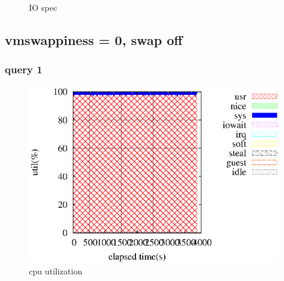 \documentclass[11pt,a4paper]{jsarticle}
\newlength{\subfigwidth}
\newlength{\subfigcolsep}
\begin{document}
\begin{figure}[thbp]
 \setlength{\subfigwidth}{.5\linewidth}
 \addtolength{\subfigwidth}{-.5\subfigcolsep}
 \begin{minipage}[b]{\subfigwidth}
 \end{minipage}
  \begin{minipage}[b]{\subfigwidth}
  \end{minipage}
  \caption{IO spec}
  \label{fig:6}
\end{figure}
\clearpage
\subsection*{vmswappiness = 0, swap off}
\subsubsection*{query 1}
\begin{figure}[thbp]
 \begin{center}
  \includegraphics[width=110mm]{swapoff1core1.eps}
 \end{center}
 \caption{cpu utilization}
 \label{fig:7cpu}
\end{figure}
\end{document}
